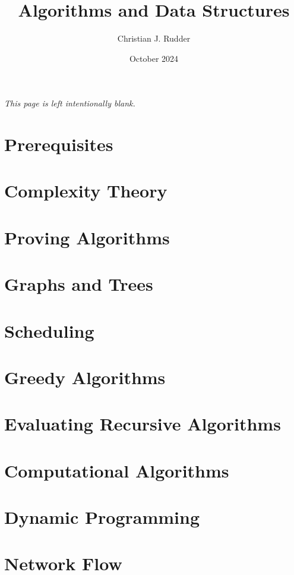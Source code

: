\documentclass{memoir}
\title{Algorithms and Data Structures}
\author{Christian J. Rudder}
\date{October 2024}
\begin{document}
\maketitle
\setcounter{tocdepth}{2}

\tableofcontents

\newpage
\thispagestyle{empty}
\mbox{}
\vfill
\begin{center}
    \textit{This page is left intentionally blank.}
\end{center}
\vfill
\newpage



\chapter*{Prerequisites}


\chapter{Complexity Theory}

\chapter{Proving Algorithms}


\chapter{Graphs and Trees}




\chapter{Scheduling}




\chapter{Greedy Algorithms}



\chapter{Evaluating Recursive Algorithms}


\chapter{Computational Algorithms}




\chapter {Dynamic Programming}



\chapter{Network Flow}

\end{document}
